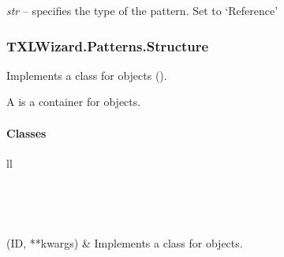 \documentclass[letterpaper,10pt,english]{sphinxmanual}
\begin{document}
\begin{fulllineitems}
\begin{fulllineitems}
\end{fulllineitems}


\begin{fulllineitems}
\label{Chapters/PythonModuleReference/Patterns/TXLWizard.Patterns.Reference:TXLWizard.Patterns.Reference.Reference.Type}
\emph{str} -- specifies the type of the pattern. Set to `Reference'

\end{fulllineitems}


\end{fulllineitems}



\subsubsection{TXLWizard.Patterns.Structure}
\label{Chapters/PythonModuleReference/Patterns/TXLWizard.Patterns.Structure:module-TXLWizard.Patterns.Structure}\label{Chapters/PythonModuleReference/Patterns/TXLWizard.Patterns.Structure::doc}\label{Chapters/PythonModuleReference/Patterns/TXLWizard.Patterns.Structure:txlwizard-patterns-structure}
Implements a class for  objects ().

A  is a container for  objects.


\paragraph{Classes}
\label{Chapters/PythonModuleReference/Patterns/TXLWizard.Patterns.Structure:classes}
\begin{longtable}{ll}
\hline
\endfirsthead

%
{{}} \\
\hline
\endhead

\hline {} \\ \hline
\endfoot

\endlastfoot


{\hyperref[Chapters/PythonModuleReference/Patterns/TXLWizard.Patterns.Structure:TXLWizard.Patterns.Structure.Structure]{}}(ID, **kwargs)
 & 
Implements a class for  objects.
\\
\hline\end{longtable}
\end{document}
